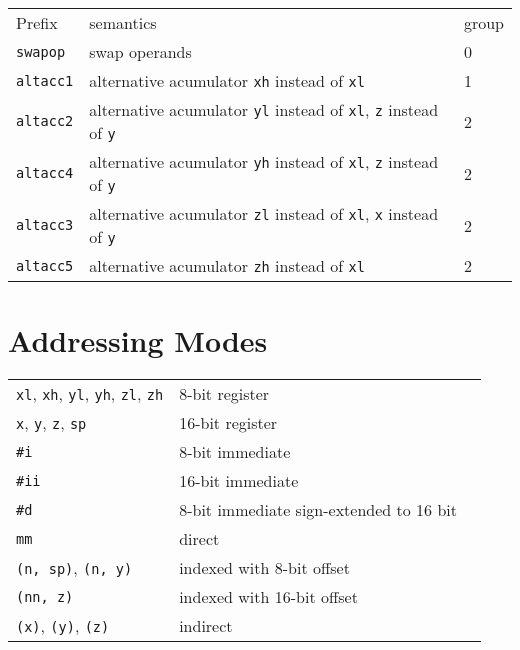\documentclass{book}
\begin{document}
\begin{tabular}{l l l}
Prefix & semantics & group \\
\texttt{swapop} & swap operands & 0 \\
\texttt{altacc1} & alternative acumulator \texttt{xh} instead of \texttt{xl} & 1 \\
\texttt{altacc2} & alternative acumulator \texttt{yl} instead of \texttt{xl}, \texttt{z} instead of \texttt{y} & 2 \\
\texttt{altacc4} & alternative acumulator \texttt{yh} instead of \texttt{xl}, \texttt{z} instead of \texttt{y} & 2 \\
\texttt{altacc3} & alternative acumulator \texttt{zl} instead of \texttt{xl}, \texttt{x} instead of \texttt{y} & 2 \\
\texttt{altacc5} & alternative acumulator \texttt{zh} instead of \texttt{xl} & 2
\end{tabular}

\section{Addressing Modes}

\begin{tabular}{l l l}
\texttt{xl}, \texttt{xh}, \texttt{yl}, \texttt{yh}, \texttt{zl}, \texttt{zh} & 8-bit register \\
\texttt{x}, \texttt{y}, \texttt{z}, \texttt{sp} & 16-bit register \\
\texttt{\#i} & 8-bit immediate \\
\texttt{\#ii} & 16-bit immediate \\
\texttt{\#d} & 8-bit immediate sign-extended to 16 bit \\
\texttt{mm} & direct \\
\texttt{(n, sp)}, \texttt{(n, y)} & indexed with 8-bit offset \\
\texttt{(nn, z)} & indexed with 16-bit offset \\
\texttt{(x)}, \texttt{(y)}, \texttt{(z)} & indirect
\end{tabular}
\end{document}
